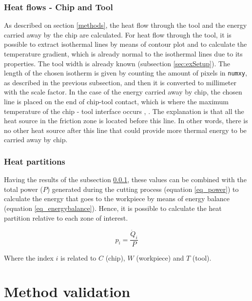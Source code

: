 		\subsubsection{Heat flows - Chip and Tool}
		\label{heatflows}

			As described on section \ref{methods}, the heat flow through the tool and the energy carried away by the chip are calculated. For heat flow through the tool, it is possible to extract isothermal lines by means of contour plot and to calculate the temperature gradient, which is already normal to the isothermal lines due to its properties. The tool width is already known (subsection \ref{sec:exSetup}). The length of the chosen isotherm is given by counting the amount of pixels in \texttt{numxy}, as described in the previous subsection, and then it is converted to millimeter with the scale factor.
			In the case of the energy carried away by chip, the chosen line is placed on the end of chip-tool contact, which is where the maximum temperature of the chip - tool interface occurs \cite{abukhshim2006heat}, \cite{boothroyd1963temperatures}. The explanation is that all the heat source in the friction zone is located before this line. In other words, there is no other heat source after this line that could provide more thermal energy to be carried away by chip.		

		\subsubsection{Heat partitions}

			Having the results of the subsection \ref{heatflows}, these values can be combined with the total power ($P$) generated during the cutting process (equation \ref{eq_power}) to calculate the energy that goes to the workpiece by means of energy balance (equation \ref{eq_energybalance}). Hence, it is possible to calculate the heat partition relative to each zone of interest.

			\begin{equation} 
			\label{eq_heatpartition}
			p_{i} = \frac{\dot{Q}_{i}}{P}
			\end{equation}

			Where the index $i$ is related to $C$ (chip), $W$ (workpiece) and $T$ (tool).

	\section{Method validation}

